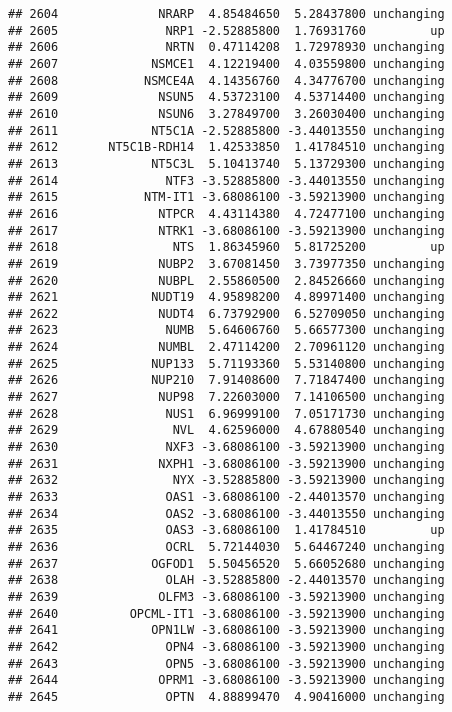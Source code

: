 \documentclass[]{article}
\begin{document}
\begin{verbatim}
## 2604              NRARP  4.85484650  5.28437800 unchanging
## 2605               NRP1 -2.52885800  1.76931760         up
## 2606               NRTN  0.47114208  1.72978930 unchanging
## 2607             NSMCE1  4.12219400  4.03559800 unchanging
## 2608            NSMCE4A  4.14356760  4.34776700 unchanging
## 2609              NSUN5  4.53723100  4.53714400 unchanging
## 2610              NSUN6  3.27849700  3.26030400 unchanging
## 2611             NT5C1A -2.52885800 -3.44013550 unchanging
## 2612       NT5C1B-RDH14  1.42533850  1.41784510 unchanging
## 2613             NT5C3L  5.10413740  5.13729300 unchanging
## 2614               NTF3 -3.52885800 -3.44013550 unchanging
## 2615            NTM-IT1 -3.68086100 -3.59213900 unchanging
## 2616              NTPCR  4.43114380  4.72477100 unchanging
## 2617              NTRK1 -3.68086100 -3.59213900 unchanging
## 2618                NTS  1.86345960  5.81725200         up
## 2619              NUBP2  3.67081450  3.73977350 unchanging
## 2620              NUBPL  2.55860500  2.84526660 unchanging
## 2621             NUDT19  4.95898200  4.89971400 unchanging
## 2622              NUDT4  6.73792900  6.52709050 unchanging
## 2623               NUMB  5.64606760  5.66577300 unchanging
## 2624              NUMBL  2.47114200  2.70961120 unchanging
## 2625             NUP133  5.71193360  5.53140800 unchanging
## 2626             NUP210  7.91408600  7.71847400 unchanging
## 2627              NUP98  7.22603000  7.14106500 unchanging
## 2628               NUS1  6.96999100  7.05171730 unchanging
## 2629                NVL  4.62596000  4.67880540 unchanging
## 2630               NXF3 -3.68086100 -3.59213900 unchanging
## 2631              NXPH1 -3.68086100 -3.59213900 unchanging
## 2632                NYX -3.52885800 -3.59213900 unchanging
## 2633               OAS1 -3.68086100 -2.44013570 unchanging
## 2634               OAS2 -3.68086100 -3.44013550 unchanging
## 2635               OAS3 -3.68086100  1.41784510         up
## 2636               OCRL  5.72144030  5.64467240 unchanging
## 2637             OGFOD1  5.50456520  5.66052680 unchanging
## 2638               OLAH -3.52885800 -2.44013570 unchanging
## 2639              OLFM3 -3.68086100 -3.59213900 unchanging
## 2640          OPCML-IT1 -3.68086100 -3.59213900 unchanging
## 2641             OPN1LW -3.68086100 -3.59213900 unchanging
## 2642               OPN4 -3.68086100 -3.59213900 unchanging
## 2643               OPN5 -3.68086100 -3.59213900 unchanging
## 2644              OPRM1 -3.68086100 -3.59213900 unchanging
## 2645               OPTN  4.88899470  4.90416000 unchanging

\end{verbatim}
\end{document}
